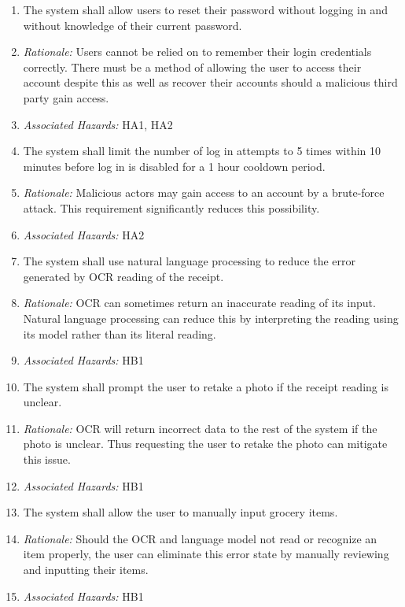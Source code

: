 \documentclass{article}
\begin{document}
\begin{enumerate}[label=SSR\arabic*.]

    \item The system shall allow users to reset their password without logging in and without knowledge of their current password.
    \item[] \emph{Rationale:} Users cannot be relied on to remember their login credentials correctly. There must be a method of allowing the user to access their account despite this as well as recover their accounts should a malicious third party gain access.
    \item[] \emph{Associated Hazards:} HA1, HA2

    \item The system shall limit the number of log in attempts to 5 times within 10 minutes before log in is disabled for a 1 hour cooldown period.
    \item[] \emph{Rationale:} Malicious actors may gain access to an account by a brute-force attack. This requirement significantly reduces this possibility.
    \item[] \emph{Associated Hazards:} HA2

    \item The system shall use natural language processing to reduce the error generated by OCR reading of the receipt.
    \item[] \emph{Rationale:} OCR can sometimes return an inaccurate reading of its input. Natural language processing can reduce this by interpreting the reading using its model rather than its literal reading.
    \item[] \emph{Associated Hazards:} HB1

    \item The system shall prompt the user to retake a photo if the receipt reading is unclear.
    \item[] \emph{Rationale:} OCR will return incorrect data to the rest of the system if the photo is unclear. Thus requesting the user to retake the photo can mitigate this issue.
    \item[] \emph{Associated Hazards:} HB1

    \item The system shall allow the user to manually input grocery items.
    \item[] \emph{Rationale:} Should the OCR and language model not read or recognize an item properly, the user can eliminate this error state by manually reviewing and inputting their items.
    \item[] \emph{Associated Hazards:} HB1


\end{enumerate}
\end{document}
